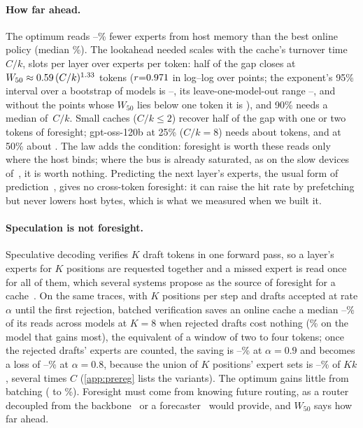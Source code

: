 \documentclass[10pt,twocolumn]{article}
\begin{document}
\paragraph{How far ahead.} The optimum reads \fsSaveMin--\fsSaveMax\% fewer experts from host memory than the best online
policy (median \fsSaveMed\%). The lookahead needed scales with the cache's turnover time $C/k$, slots per layer over
experts per token: half of the gap closes at $W_{50}\approx0.59\,(C/k)^{1.33}$ tokens ($r{=}0.971$ in log--log over
\fsFitN{} points; the exponent's 95\% interval over a bootstrap of models is \fsExpLo--\fsExpHi, its leave-one-model-out
range \fsExpLomoMin--\fsExpLomoMax, and without the \fsInterp{} points whose $W_{50}$ lies below one token it is
\fsExpNoInterp), and 90\% needs a median of \fsNinety$\,C/k$. Small caches ($C/k\le2$) recover half of the gap with
one or two tokens of foresight; gpt-oss-120b at 25\% ($C/k{=}8$) needs about \fsGptQuarter{} tokens, and at 50\%
about \fsGptHalf. The law adds the condition: foresight is worth these reads only where the host binds; where the
bus is already saturated, as on the slow devices of~\cite{wisp2026,budgetingbytes2026}, it is worth nothing.
Predicting the next layer's experts, the usual form of prediction~\cite{hwang2024pregated,zhu2025preattention},
gives no cross-token foresight: it can raise the hit rate by prefetching but never lowers host bytes, which is what we
measured when we built it.

\paragraph{Speculation is not foresight.} Speculative decoding verifies $K$ draft tokens in one forward pass, so a
layer's experts for $K$ positions are requested together and a missed expert is read once for all of them, which
several systems propose as the source of foresight for a cache~\cite{spmoe,moespac2026,cascade2025}. On the same
traces, with $K$ positions per step and drafts accepted at rate $\alpha$ until the first rejection, batched
verification saves an online cache a median \bkFreeMin--\bkFreeMax\% of its reads across models at $K{=}8$ when
rejected drafts cost nothing (\bkFreeModelMax\% on the model that gains most), the equivalent of a window of two to
four tokens; once the rejected drafts' experts are counted, the saving
is \bkSameNineMin--\bkSameNineMax\% at $\alpha{=}0.9$ and becomes a loss of \bkSameEightLossMin--\bkSameEightLossMax\% at
$\alpha{=}0.8$, because the union of $K$ positions' expert sets is \bkUnionMin--\bkUnionMax\% of $Kk$, several times
$C$ (\cref{app:prereg} lists the variants). The optimum gains little from batching (\bkBeladyMin{} to
\bkBeladyMax\%). Foresight must come from knowing future routing, as a router decoupled from the
backbone~\cite{readme2024} or a forecaster~\cite{wang2026seqmoe} would provide, and $W_{50}$ says how far ahead.
\end{document}
